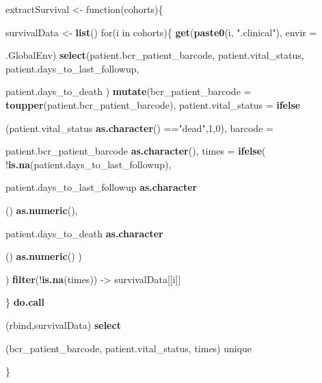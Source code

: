 \documentclass[]{article}
\newenvironment{Shaded}{\begin{snugshade}}{\end{snugshade}}
\newcommand{\KeywordTok}[1]{\textcolor[rgb]{0.13,0.29,0.53}{\textbf{{#1}}}}
\newcommand{\DataTypeTok}[1]{\textcolor[rgb]{0.13,0.29,0.53}{{#1}}}
\newcommand{\DecValTok}[1]{\textcolor[rgb]{0.00,0.00,0.81}{{#1}}}
\newcommand{\StringTok}[1]{\textcolor[rgb]{0.31,0.60,0.02}{{#1}}}
\newcommand{\NormalTok}[1]{{#1}}
\begin{document}
\begin{Shaded}
\begin{Highlighting}[]
\NormalTok{extractSurvival <-}\StringTok{ }\NormalTok{function(cohorts)\{}
  
  \NormalTok{survivalData <-}\StringTok{ }\KeywordTok{list}\NormalTok{()}
  \NormalTok{for(i in cohorts)\{}
    \KeywordTok{get}\NormalTok{(}\KeywordTok{paste0}\NormalTok{(i, }\StringTok{".clinical"}\NormalTok{), }\DataTypeTok{envir =} \NormalTok{.GlobalEnv) %>%}
\StringTok{                }\KeywordTok{select}\NormalTok{(patient.bcr_patient_barcode,}
                             \NormalTok{patient.vital_status,}
                             \NormalTok{patient.days_to_last_followup,}
                             \NormalTok{patient.days_to_death ) %>%}
\StringTok{                }\KeywordTok{mutate}\NormalTok{(}\DataTypeTok{bcr_patient_barcode =} \KeywordTok{toupper}\NormalTok{(patient.bcr_patient_barcode),}
                       \DataTypeTok{patient.vital_status =} \KeywordTok{ifelse}\NormalTok{(patient.vital_status %>%}
\StringTok{                                                 }\KeywordTok{as.character}\NormalTok{() ==}\StringTok{"dead"}\NormalTok{,}\DecValTok{1}\NormalTok{,}\DecValTok{0}\NormalTok{),}
                   \DataTypeTok{barcode =} \NormalTok{patient.bcr_patient_barcode %>%}
\StringTok{                                     }\KeywordTok{as.character}\NormalTok{(),}
                 \DataTypeTok{times =} \KeywordTok{ifelse}\NormalTok{( !}\KeywordTok{is.na}\NormalTok{(patient.days_to_last_followup),}
                      \NormalTok{patient.days_to_last_followup %>%}
\StringTok{                        }\KeywordTok{as.character}\NormalTok{() %>%}
\StringTok{                        }\KeywordTok{as.numeric}\NormalTok{(),}
               \NormalTok{patient.days_to_death %>%}
\StringTok{                        }\KeywordTok{as.character}\NormalTok{() %>%}
\StringTok{                        }\KeywordTok{as.numeric}\NormalTok{() )}
                     \NormalTok{) %>%}
\StringTok{   }\KeywordTok{filter}\NormalTok{(!}\KeywordTok{is.na}\NormalTok{(times)) ->}\StringTok{ }\NormalTok{survivalData[[i]]}
  
  
  \NormalTok{\}}
  \KeywordTok{do.call}\NormalTok{(rbind,survivalData) %>%}
\StringTok{    }\KeywordTok{select}\NormalTok{(bcr_patient_barcode, patient.vital_status, times) %>%}
\StringTok{    }\NormalTok{unique  }

\NormalTok{\}}


}}}}}}}}}}}
\end{Highlighting}
\end{Shaded}
\end{document}
